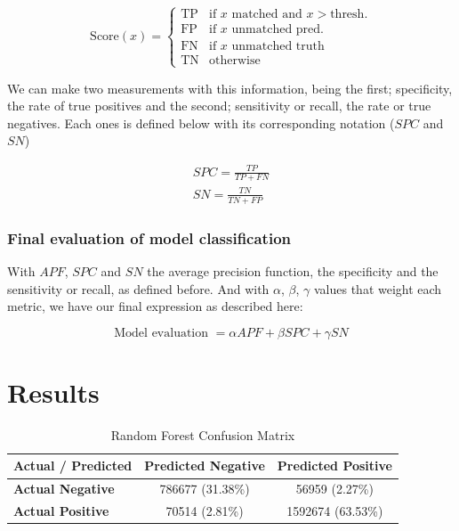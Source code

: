 \documentclass{article}
\begin{document}
\[
\text{Score}(x) = 
\begin{cases} 
\text{TP} & \text{if }x \text{ matched and } x > \text{thresh.} \\
\text{FP} & \text{if }x \text{ unmatched pred.} \\
\text{FN} & \text{if }x \text{ unmatched truth} \\
\text{TN} & \text{otherwise}
\end{cases}
\]

We can make two measurements with this information, being the first; specificity, the rate of true positives and the second; sensitivity or recall, the rate or true negatives. Each ones is defined below with its corresponding notation ($SPC$ and $SN$)

\begin{gather}
  SPC = \frac{TP}{TP + FN} \\
  SN = \frac{TN}{TN + FP}
\end{gather}

\subsubsection{Final evaluation of model classification}

With $APF$, $SPC$ and $SN$ the average precision function, the specificity and the sensitivity or recall, as defined before. And with $\alpha$, $\beta$, $\gamma$ values that weight each metric, we have our final expression as described here:

\begin{equation*}
\text{Model evaluation } = \alpha APF + \beta SPC + \gamma SN 
\end{equation*}

\vspace{.5em}



\section{Results}

\begin{table}[h]
    \centering
    \caption{Random Forest Confusion Matrix}
    \label{tab:random_forest_confusion_matrix}
    \begin{tabular}{lcc}
        \hline
        \textbf{Actual / Predicted} & \textbf{Predicted Negative} & \textbf{Predicted Positive} \\
        \hline
        \textbf{Actual Negative} & 786677 (31.38\%) & 56959 (2.27\%) \\
        \textbf{Actual Positive} & 70514 (2.81\%) & 1592674 (63.53\%) \\
        \hline
    \end{tabular}
\end{table}
\end{document}
